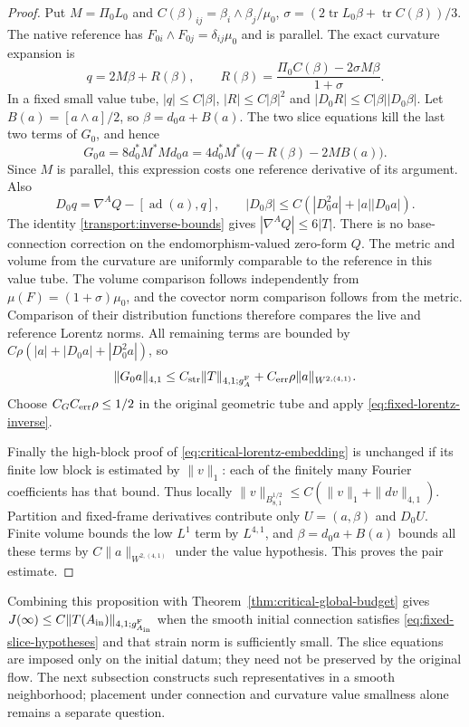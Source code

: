 \documentclass[11pt]{article}
\numberwithin{equation}{section}
\theoremstyle{definition}
\theoremstyle{remark}
\DeclareMathOperator{\tr}{tr}
\begin{document}
\begin{proof}
Put $M=\Pi_0L_0$ and
$C(\beta)_{ij}=\beta_i\wedge\beta_j/\mu_0$,
$\sigma=(2\tr L_0\beta+\tr C(\beta))/3$.
The native reference has
$F_{0i}\wedge F_{0j}=\delta_{ij}\mu_0$ and is parallel.
The exact curvature expansion is
\[
 q=2M\beta+R(\beta),\qquad
 R(\beta)=\frac{\Pi_0C(\beta)-2\sigma M\beta}{1+\sigma}.
\]
In a fixed small value tube,
$|q|\le C|\beta|$, $|R|\le C|\beta|^2$ and
$|D_0R|\le C|\beta||D_0\beta|$.
Let $B(a)=[a\wedge a]/2$, so $\beta=d_0a+B(a)$.
The two slice equations kill the last two terms
of $G_0$, and hence
\[
 G_0a=8d_0^*M^*Md_0a
     =4d_0^*M^*\bigl(q-R(\beta)-2MB(a)\bigr).
\]
Since $M$ is parallel, this expression costs one
reference derivative of its argument.
Also
\[
 D_0q=\nabla^AQ-[\operatorname{ad}(a),q],\qquad
 |D_0\beta|\le C(|D_0^2a|+|a||D_0a|).
\]
The identity \eqref{transport:inverse-bounds}
gives $|\nabla^AQ|\le6|T|$.
There is no base-connection correction on the
endomorphism-valued zero-form $Q$.
The metric and volume from the curvature are uniformly
comparable to the reference in this value tube.
The volume comparison follows independently from
$\mu(F)=(1+\sigma)\mu_0$, and the covector norm
comparison follows from the metric.
Comparison of their distribution functions therefore
compares the live and reference Lorentz norms.
All remaining terms are bounded by
$C\rho(|a|+|D_0a|+|D_0^2a|)$, so
\[
 \|G_0a\|_{4,1}
 \le C_{\rm str}\|T\|_{4,1;g_A^{\rm F}}
       +C_{\rm err}\rho\|a\|_{W^{2,(4,1)}} .
\]
Choose $C_GC_{\rm err}\rho\le1/2$ in the original
geometric tube and apply \eqref{eq:fixed-lorentz-inverse}.

Finally the high-block proof of
\eqref{eq:critical-lorentz-embedding} is unchanged
if its finite low block is estimated by $\|v\|_1$:
each of the finitely many Fourier coefficients has
that bound. Thus locally
$\|v\|_{B^{1/2}_{8,1}}\le C(\|v\|_1+\|dv\|_{4,1})$.
Partition and fixed-frame derivatives contribute
only $U=(a,\beta)$ and $D_0U$.
Finite volume bounds the low $L^1$ term by $L^{4,1}$,
and $\beta=d_0a+B(a)$ bounds all these terms by
$C\|a\|_{W^{2,(4,1)}}$ under the value hypothesis.
This proves the pair estimate.
\end{proof}

Combining this proposition with
Theorem~\ref{thm:critical-global-budget} gives
$J(\infty)\le C\|T(A_{\rm in})\|_{4,1;g_{A_{\rm in}}^{\rm F}}$
when the smooth initial connection satisfies
\eqref{eq:fixed-slice-hypotheses} and that strain norm
is sufficiently small. The slice equations are imposed
only on the initial datum; they need not be preserved
by the original flow. The next subsection constructs
such representatives in a smooth neighborhood; placement
under connection and curvature value smallness alone
remains a separate question.
\end{document}
